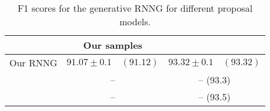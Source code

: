 

\begin{table}[h]
  \center
  \begin{tabular}{l|c|c}
        & Our samples & \citet{dyer2016rnng} \\ \hline
      Our RNNG  & $91.07 \pm	0.1 \quad (91.12)$ & $93.32 \pm 0.1 \quad (93.32)$  \\
      \citet{dyer2016rnng}  & -- & -- \quad (93.3) \\
      \citet{kuncoro2017syntax} & -- & -- \quad (93.5)
  \end{tabular}
  \caption{F1 scores for the generative RNNG for different proposal models.}
  \label{tab:gen-fscores}
\end{table}
